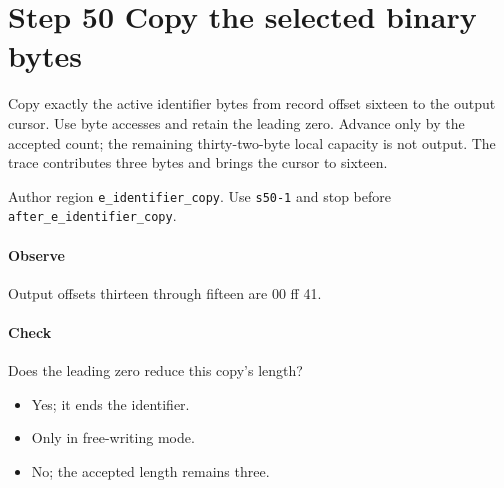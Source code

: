 \section{Step 50 Copy the selected binary bytes}\label{cbor-s50}
Copy exactly the active identifier bytes from record offset sixteen to the output cursor. Use byte accesses and retain the leading zero. Advance only by the accepted count; the remaining thirty-two-byte local capacity is not output. The trace contributes three bytes and brings the cursor to sixteen.

Author region \texttt{e\_identifier\_copy}. Use \texttt{s50-1} and stop before \texttt{after\_e\_identifier\_copy}.

\paragraph{Observe} Output offsets thirteen through fifteen are 00 ff 41.

\paragraph{Check} Does the leading zero reduce this copy's length?
\begin{itemize}
  \item[A.] Yes; it ends the identifier.
  \item[B.] Only in free-writing mode.
  \item[C.] No; the accepted length remains three.
\end{itemize}
